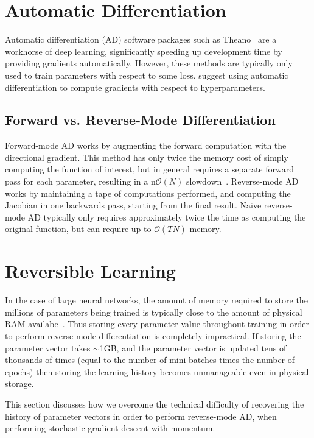 \documentclass{article}
\newcommand{\numhypers}{N}
\newcommand{\numsteps}{T}
\begin{document}
\section{Automatic Differentiation}

Automatic differentiation (AD) software packages such as Theano~\cite{Bastien-Theano-2012, bergstra2010scipy} are a workhorse of deep learning, significantly speeding up development time by providing gradients automatically.
However, these methods are typically only used to train parameters with respect to some loss.
\cite{Autodiff14} suggest using automatic differentiation to compute gradients with respect to hyperparameters.

\subsection{Forward vs. Reverse-Mode Differentiation}

Forward-mode AD works by augmenting the forward computation with the directional gradient.
This method has only twice the memory cost of simply computing the function of interest, but in general requires a separate forward pass for each parameter, resulting in a n$\mathcal{O}(\numhypers)$ slowdown~\cite{pearlmutter2008reverse}.
Reverse-mode AD works by maintaining a tape of computations performed, and computing the Jacobian in one backwards pass, starting from the final result.
Naive reverse-mode AD typically only requires approximately twice the time as computing the original function, but can require up to $\mathcal{O}(\numsteps\numhypers)$ memory.

\section{Reversible Learning}

In the case of large neural networks, the amount of memory required to store the millions of parameters being trained is typically close to the amount of physical RAM availabe~\cite{sequence2014}.
Thus storing every parameter value throughout training in order to perform reverse-mode differentiation is completely impractical.
If storing the parameter vector takes $\sim$1GB, and the parameter vector is updated tens of thousands of times (equal to the number of mini batches times the number of epochs) then storing the learning history becomes unmanageable even in physical storage.

This section discusses how we overcome the technical difficulty of recovering the history of parameter vectors in order to perform reverse-mode AD, when performing stochastic gradient descent with momentum.
\end{document}
